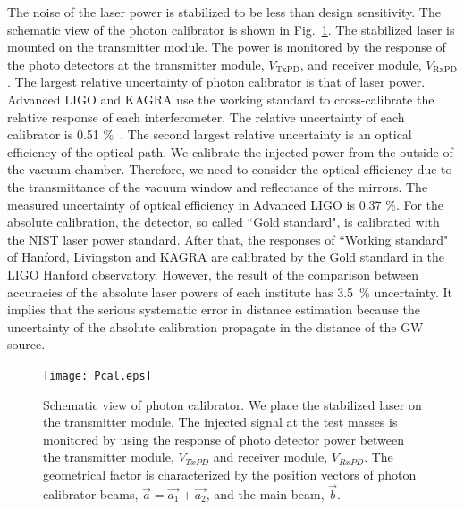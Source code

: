 \documentclass[%
 reprint,
superscriptaddress,
 amsmath,amssymb,
 aps,
]{revtex4-1}
\begin{document}
The noise of the laser power is stabilized to be less than design sensitivity. The schematic view of the photon calibrator is shown in Fig.~\ref{fig:Pcal}. The stabilized laser is mounted on the transmitter module. The power is monitored by the response of the photo detectors at the transmitter module, $V_{\mathrm{TxPD}}$, and receiver module, $V_{\mathrm{RxPD}}$.  
The largest relative uncertainty of photon calibrator is that of laser power.
Advanced LIGO and KAGRA use the working standard to cross-calibrate the relative response of each interferometer. The relative uncertainty of  each  calibrator is 0.51 \%~\cite{doi:10.1063/1.4967303}. 
The second largest relative uncertainty is an optical efficiency of the optical path. We calibrate the injected power from the outside of the vacuum chamber. Therefore, we need to consider the optical efficiency due to the transmittance of the vacuum window and reflectance of the mirrors. The measured uncertainty of optical efficiency in Advanced LIGO is 0.37 \%. 
For the absolute calibration, the detector, so called ``Gold standard", is calibrated with the NIST laser power standard. After that, the responses of ``Working standard" of Hanford, Livingston and KAGRA are calibrated by the Gold standard in the LIGO Hanford observatory. 
However, the result of the comparison between accuracies of the absolute laser powers of each institute has 3.5~\% uncertainty. It implies that the serious systematic error in distance estimation because the uncertainty of the absolute calibration propagate in the distance of the GW source.

\begin{figure}
\begin{center}
\texttt{[image: Pcal.eps]}
\caption{Schematic view of photon calibrator. We place the stabilized laser on the transmitter module. The injected signal at the test masses is monitored by using the response of photo detector power between the transmitter module, $V_{TxPD}$ and  receiver module, $V_{RxPD}$.  The geometrical factor is characterized by the position vectors of photon calibrator beams, $\vec{a}=\vec{a_1}+\vec{a_2}$, and the main beam, $\vec{b}$.}
\label{fig:Pcal}
\end{center}
\end{figure}
\end{document}
